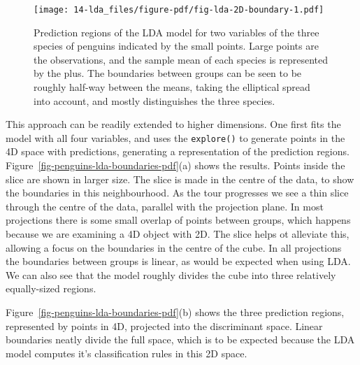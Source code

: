 \documentclass[
  letterpaper,
]{krantz}
\begin{document}
\begin{figure}[H]

{\centering \texttt{[image: 14-lda\_files/figure-pdf/fig-lda-2D-boundary-1.pdf]}

}

\caption{\label{fig-lda-2D-boundary}Prediction regions of the LDA model
for two variables of the three species of penguins indicated by the
small points. Large points are the observations, and the sample mean of
each species is represented by the plus. The boundaries between groups
can be seen to be roughly half-way between the means, taking the
elliptical spread into account, and mostly distinguishes the three
species.}

\end{figure}


This approach can be readily extended to higher dimensions. One first
fits the model with all four variables, and uses the \texttt{explore()}
to generate points in the 4D space with predictions, generating a
representation of the prediction regions.
Figure~\ref{fig-penguins-lda-boundaries-pdf}(a) shows the results.
Points inside the slice are shown in larger size. The slice is made in
the centre of the data, to show the boundaries in this neighbourhood. As
the tour progresses we see a thin slice through the centre of the data,
parallel with the projection plane. In most projections there is some
small overlap of points between groups, which happens because we are
examining a 4D object with 2D. The slice helps ot alleviate this,
allowing a focus on the boundaries in the centre of the cube. In all
projections the boundaries between groups is linear, as would be
expected when using LDA. We can also see that the model roughly divides
the cube into three relatively equally-sized regions.

Figure~\ref{fig-penguins-lda-boundaries-pdf}(b) shows the three
prediction regions, represented by points in 4D, projected into the
discriminant space. Linear boundaries neatly divide the full space,
which is to be expected because the LDA model computes it's
classification rules in this 2D space.\\
\end{document}
